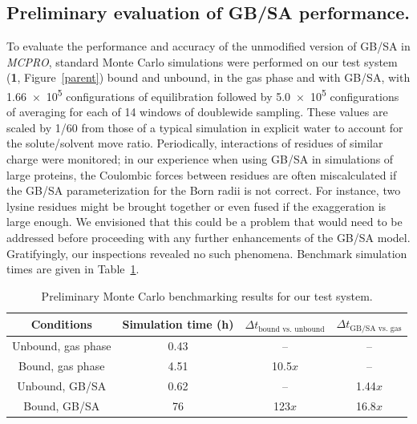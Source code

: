 \documentclass[12pt]{report}
\def\tablab{Table}\def\tabslab{\tablab s}
\def\figlab{Figure}\def\figslab{\figlab s}
\newcommand*\tbl[1]{\tablab~\ref{#1}}
\newcommand*\fig[1]{\figlab~\ref{#1}}
\begin{document}
\subsection{Preliminary evaluation of GB/SA performance.}

To evaluate the performance and accuracy of the unmodified version of GB/SA in \textit{MCPRO}, standard Monte Carlo simulations were performed on our test system (\textbf{1}, \fig{parent}) bound and unbound, in the gas phase and with GB/SA, with \num{1.66e5} configurations of equilibration followed by \num{5.0e5} configurations of averaging for each of 14 windows of doublewide sampling. These values are scaled by 1/60 from those of a typical simulation in explicit water to account for the solute/solvent move ratio. Periodically, interactions of residues of similar charge were monitored; in our experience when using GB/SA in simulations of large proteins, the Coulombic forces between residues are often miscalculated if the GB/SA parameterization for the Born radii is not correct. For instance, two lysine residues might be brought together or even fused if the exaggeration is large enough. We envisioned that this could be a problem that would need to be addressed before proceeding with any further enhancements of the GB/SA model. Gratifyingly, our inspections revealed no such phenomena. Benchmark simulation times are given in \tbl{prelim}. 

\begin{table}[htbp]
\centering
\caption{Preliminary Monte Carlo benchmarking results for our test system.}
\begin{tabular}{cccc}
\toprule
Conditions              & Simulation time (h) & $\Delta t_{\textrm{bound vs. unbound}}$ & $\Delta t_{\textrm{GB/SA vs.\ gas}}$ \\
\midrule
Unbound, gas phase      & 0.43                & --                                                     & --\\
Bound,   gas phase      & 4.51                & 10.5$x$                                                & --\\
Unbound, GB/SA          & 0.62                & --                                                     & 1.44$x$\\
Bound,   GB/SA          & 76                  & 123$x$                                                 & 16.8$x$\\
\bottomrule
\end{tabular}%
\label{prelim}%
\end{table}%
\end{document}
